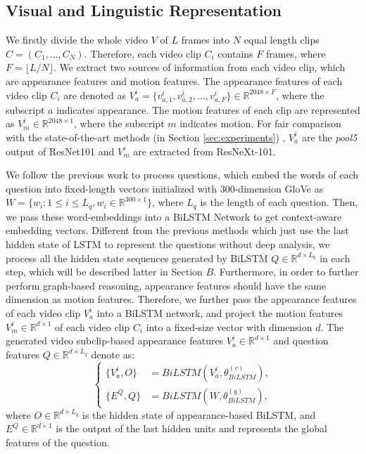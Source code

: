 \documentclass[journal]{IEEEtran}
\begin{document}
\subsection{Visual and Linguistic Representation} 
We firstly divide the whole video $V$ of $L$ frames into $N$ equal length clips $C = \left(C_1,\dots,C_N\right)$. Therefore, each video clip $C_i$ contains $F$ frames, where $F = \lfloor{L/N}\rfloor$. We extract two sources of information from each video clip, which are appearance features and motion features. The appearance features of each video clip $C_i$ are denoted as $V^i_a = \{v^i_{a,1},v^i_{a,2},\dots,v^i_{a,F}\} \in \mathbb{R}^{2048 \times F}$, where the subscript $a$ indicates appearance. The motion features of each clip are represented as $V^i_m \in \mathbb{R}^{2048 \times 1}$, where the subscript $m$ indicates motion. For fair comparison with the state-of-the-art methods (in Section \ref{sec:experiments}) \cite{le2020hierarchical}, $V^i_a$ are the \textit{pool5} output of ResNet101 and $V^i_m$ are extracted from ResNeXt-101.

We follow the previous work \cite{le2020hierarchical,yang2019question} to process questions, which embed the words of each question into fixed-length vectors initialized with 300-dimension GloVe \cite{pennington2014glove} as $W = \{w_i: 1 \leqslant i \leqslant L_q, w_i \in \mathbb{R}^{300 \times 1}\}$, where $L_q$ is the length of each question. Then, we pass these word-embeddings into a BiLSTM Network to get context-aware embedding vectors. Different from the previous methods which just use the last hidden state of LSTM to represent the questions without deep analysis, we process all the hidden state sequences generated by BiLSTM $Q \in \mathbb{R}^{d \times L_q}$ in each step, which will be described latter in Section $B$. Furthermore, in order to further perform graph-based reasoning, appearance features should have the same dimension as motion features. Therefore, we further pass the appearance features of each video clip $V^i_a$ into a BiLSTM network, and project the motion features $V^i_m \in \mathbb{R}^{d \times 1}$ of each video clip $C_i$ into a fixed-size vector with dimension $d$. The generated video subclip-based appearance features $V^i_a \in \mathbb{R}^{d \times 1}$ and question features $Q \in \mathbb{R}^{d \times L_q}$ denote as:
\begin{equation}
\left\{
\begin{aligned}
   \{V^i_a, O\} & = BiLSTM\left(V^i_a, \theta^{\left(v\right)}_{BiLSTM}\right),\\
   \{E^Q, Q\} & = BiLSTM\left(W, \theta^{\left(q\right)}_{BiLSTM}\right),
\end{aligned}
\right.
\end{equation}
where $O \in \mathbb{R}^{d \times L_q}$ is the hidden state of appearance-based BiLSTM, and $E^Q \in \mathbb{R}^{d \times 1}$ is the output of the last hidden units and represents the global features of the question.
\end{document}
